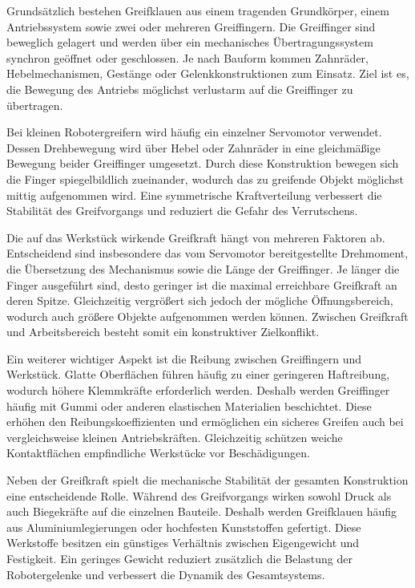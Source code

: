 Grundsätzlich bestehen Greifklauen aus einem tragenden Grundkörper, einem Antriebssystem sowie zwei oder mehreren Greiffingern. Die Greiffinger sind beweglich gelagert und werden über ein mechanisches Übertragungssystem synchron geöffnet oder geschlossen. Je nach Bauform kommen Zahnräder, Hebelmechanismen, Gestänge oder Gelenkkonstruktionen zum Einsatz. Ziel ist es, die Bewegung des Antriebs möglichst verlustarm auf die Greiffinger zu übertragen.

Bei kleinen Robotergreifern wird häufig ein einzelner Servomotor verwendet. Dessen Drehbewegung wird über Hebel oder Zahnräder in eine gleichmäßige Bewegung beider Greiffinger umgesetzt. Durch diese Konstruktion bewegen sich die Finger spiegelbildlich zueinander, wodurch das zu greifende Objekt möglichst mittig aufgenommen wird. Eine symmetrische Kraftverteilung verbessert die Stabilität des Greifvorgangs und reduziert die Gefahr des Verrutschens.

Die auf das Werkstück wirkende Greifkraft hängt von mehreren Faktoren ab. Entscheidend sind insbesondere das vom Servomotor bereitgestellte Drehmoment, die Übersetzung des Mechanismus sowie die Länge der Greiffinger. Je länger die Finger ausgeführt sind, desto geringer ist die maximal erreichbare Greifkraft an deren Spitze. Gleichzeitig vergrößert sich jedoch der mögliche Öffnungsbereich, wodurch auch größere Objekte aufgenommen werden können. Zwischen Greifkraft und Arbeitsbereich besteht somit ein konstruktiver Zielkonflikt.

Ein weiterer wichtiger Aspekt ist die Reibung zwischen Greiffingern und Werkstück. Glatte Oberflächen führen häufig zu einer geringeren Haftreibung, wodurch höhere Klemmkräfte erforderlich werden. Deshalb werden Greiffinger häufig mit Gummi oder anderen elastischen Materialien beschichtet. Diese erhöhen den Reibungskoeffizienten und ermöglichen ein sicheres Greifen auch bei vergleichsweise kleinen Antriebskräften. Gleichzeitig schützen weiche Kontaktflächen empfindliche Werkstücke vor Beschädigungen.

Neben der Greifkraft spielt die mechanische Stabilität der gesamten Konstruktion eine entscheidende Rolle. Während des Greifvorgangs wirken sowohl Druck als auch Biegekräfte auf die einzelnen Bauteile. Deshalb werden Greifklauen häufig aus Aluminiumlegierungen oder hochfesten Kunststoffen gefertigt. Diese Werkstoffe besitzen ein günstiges Verhältnis zwischen Eigengewicht und Festigkeit. Ein geringes Gewicht reduziert zusätzlich die Belastung der Robotergelenke und verbessert die Dynamik des Gesamtsystems.

